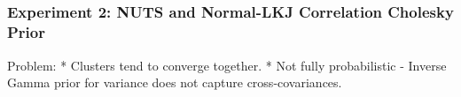 \documentclass[11pt]{article}
\begin{document}
    \begin{center}
    \end{center}
    { \hspace*{\fill} \\}
    
    \begin{center}
    \end{center}
    { \hspace*{\fill} \\}
    
    \begin{center}
    \end{center}
    { \hspace*{\fill} \\}
    
    \begin{center}
    \end{center}
    { \hspace*{\fill} \\}
    
    \begin{center}
    \end{center}
    { \hspace*{\fill} \\}
    
    \begin{center}
    \end{center}
    { \hspace*{\fill} \\}
    
    \subsubsection{Experiment 2: NUTS and Normal-LKJ Correlation Cholesky
Prior}\label{experiment-2-nuts-and-normal-lkj-correlation-cholesky-prior}

Problem: * Clusters tend to converge together. * Not fully probabilistic
- Inverse Gamma prior for variance does not capture cross-covariances.
\end{document}
